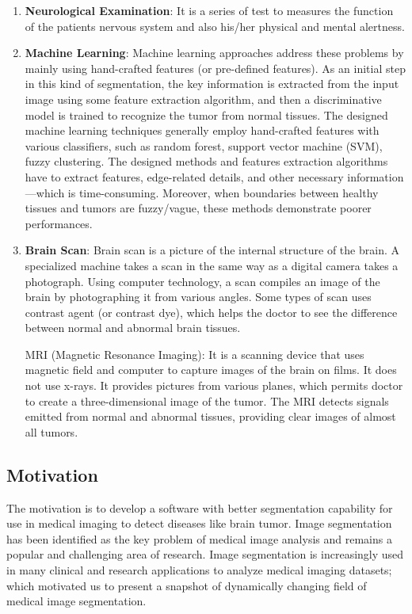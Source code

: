 \documentclass[11pt]{article}
\begin{document}
	\begin{enumerate}
		\item \textbf{Neurological Examination}: It is a series of test to
			measures the function of the patients nervous system and also
			his/her physical and mental alertness.
		\item \textbf{Machine Learning}: Machine learning approaches address
			these problems by mainly using hand-crafted features (or pre-defined
			features). As an initial step in this kind of segmentation, the key
			information is extracted from the input image using some feature
			extraction algorithm, and then a discriminative model is trained to
			recognize the tumor from normal tissues. The designed machine
			learning techniques generally employ hand-crafted features with
			various classifiers, such as random forest, support vector machine
			(SVM), fuzzy clustering. The designed methods and features
			extraction algorithms have to extract features, edge-related
			details, and other necessary information—which is time-consuming.
			Moreover, when boundaries between healthy tissues and tumors are
			fuzzy/vague, these methods demonstrate poorer performances.
		\item \textbf{Brain Scan}: Brain scan is a picture of the internal
			structure of the brain. A specialized machine takes a scan in the
			same way as a digital camera takes a photograph. Using computer
			technology, a scan compiles an image of the brain by photographing
			it from various angles. Some types of scan uses contrast agent (or
			contrast dye), which helps the doctor to see the difference between
			normal and abnormal brain tissues.

			MRI (Magnetic Resonance Imaging): It is a scanning device that uses
			magnetic field and computer to capture images of the brain on films.
			It does not use x-rays. It provides pictures from various planes,
			which permits doctor to create a three-dimensional image of the
			tumor. The MRI detects signals emitted from normal and abnormal
			tissues, providing clear images of almost all tumors.
	\end{enumerate}

	\subsection[motivation]{Motivation}
	The motivation is to develop a software with better segmentation capability
	for use in medical imaging to detect diseases like brain tumor. Image
	segmentation has been identified as the key problem of medical image
	analysis and remains a popular and challenging area of research. Image
	segmentation is increasingly used in many clinical and research applications
	to analyze medical imaging datasets; which motivated us to present a
	snapshot of dynamically changing field of medical image segmentation.
\end{document}
